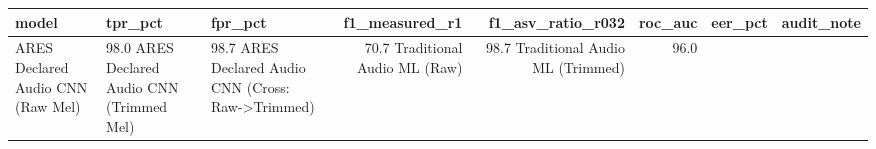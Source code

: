 \begin{tabular}{lllrrrll}
\toprule
model & tpr_pct & fpr_pct & f1_measured_r1 & f1_asv_ratio_r032 & roc_auc & eer_pct & audit_note \\
\midrule
ARES Declared Audio CNN (Raw Mel) & 98.0%
ARES Declared Audio CNN (Trimmed Mel) & 98.7%
ARES Declared Audio CNN (Cross: Raw->Trimmed) & 70.7%
Traditional Audio ML (Raw) & 98.7%
Traditional Audio ML (Trimmed) & 96.0%
\bottomrule
\end{tabular}

